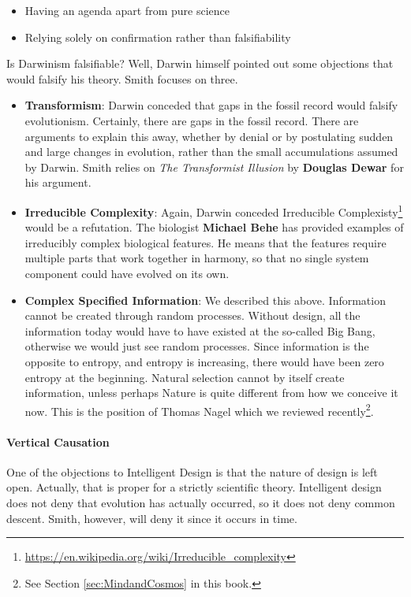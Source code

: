 \begin{itemize}
\item Having an agenda apart from pure science 
\item Relying solely on confirmation rather than falsifiability 
\end{itemize}
Is Darwinism falsifiable? Well, Darwin himself pointed out some objections that would falsify his theory. Smith focuses on three.

\begin{itemize}
\item \textbf{Transformism}: Darwin conceded that gaps in the fossil record would falsify evolutionism. Certainly, there are gaps in the fossil record. There are arguments to explain this away, whether by denial or by postulating sudden and large changes in evolution, rather than the small accumulations assumed by Darwin. Smith relies on \emph{The Transformist Illusion} by \textbf{Douglas Dewar} for his argument. 
\item \textbf{Irreducible Complexity}: Again, Darwin conceded Irreducible Complexisty\footnote{\url{https://en.wikipedia.org/wiki/Irreducible_complexity}} would be a refutation. The biologist \textbf{Michael Behe} has provided examples of irreducibly complex biological features. He means that the features require multiple parts that work together in harmony, so that no single system component could have evolved on its own. 
\item \textbf{Complex Specified Information}: We described this above. Information cannot be created through random processes. Without design, all the information today would have to have existed at the so-called Big Bang, otherwise we would just see random processes. Since information is the opposite to entropy, and entropy is increasing, there would have been zero entropy at the beginning. Natural selection cannot by itself create information, unless perhaps Nature is quite different from how we conceive it now. This is the position of Thomas Nagel which we reviewed recently\footnote{See Section \ref{sec:MindandCosmos} in this book.}. 
\end{itemize}

\paragraph{Vertical Causation}
One of the objections to Intelligent Design is that the nature of design is left open. Actually, that is proper for a strictly scientific theory. Intelligent design does not deny that evolution has actually occurred, so it does not deny common descent. Smith, however, will deny it since it occurs in time.

